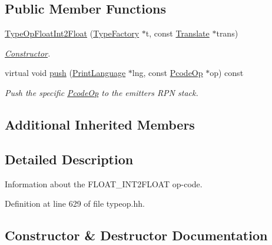 \subsection*{Public Member Functions}
\begin{DoxyCompactItemize}
\item 
\mbox{\hyperlink{class_type_op_float_int2_float_a7584d7855079900a648fc8f8d534ff18}{Type\+Op\+Float\+Int2\+Float}} (\mbox{\hyperlink{class_type_factory}{Type\+Factory}} $\ast$t, const \mbox{\hyperlink{class_translate}{Translate}} $\ast$trans)
\begin{DoxyCompactList}\small\item\em \mbox{\hyperlink{class_constructor}{Constructor}}. \end{DoxyCompactList}\item 
virtual void \mbox{\hyperlink{class_type_op_float_int2_float_a24a3d658921d5cd83e2f4233c38bb14f}{push}} (\mbox{\hyperlink{class_print_language}{Print\+Language}} $\ast$lng, const \mbox{\hyperlink{class_pcode_op}{Pcode\+Op}} $\ast$op) const
\begin{DoxyCompactList}\small\item\em Push the specific \mbox{\hyperlink{class_pcode_op}{Pcode\+Op}} to the emitter\textquotesingle{}s R\+PN stack. \end{DoxyCompactList}\end{DoxyCompactItemize}
\subsection*{Additional Inherited Members}


\subsection{Detailed Description}
Information about the F\+L\+O\+A\+T\+\_\+\+I\+N\+T2\+F\+L\+O\+AT op-\/code. 

Definition at line 629 of file typeop.\+hh.



\subsection{Constructor \& Destructor Documentation}
\mbox{\label{class_type_op_float_int2_float_a7584d7855079900a648fc8f8d534ff18}} 

